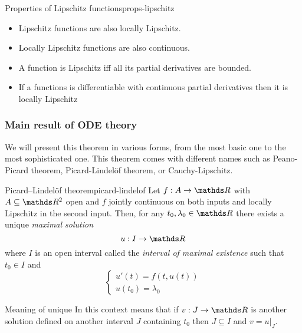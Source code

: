 \documentclass[12pt]{extarticle}
\begin{document}
\begin{proposition}{Properties of Lipschitz functions}{props-lipschitz}
    \begin{itemize}
        \item Lipschitz functions are also locally Lipschitz.
        \item Locally Lipschitz functions are also continuous.
        \item A function is Lipschitz iff all its partial derivatives are bounded.
        \item If a functions is differentiable with continuous partial derivatives then it is locally Lipschitz
    \end{itemize}
\end{proposition}

\subsubsection{Main result of ODE theory}

We will present this theorem in various forms, from the most basic one to the most sophisticated one.
This theorem comes with different names such as Peano-Picard theorem, Picard-Lindelöf theorem, or Cauchy-Lipschitz.

\begin{theorem}{Picard–Lindelöf theorem}{picard-lindelof}
    Let $f: A \to \R$ with $A \subseteq \R^2$ open and $f$ jointly continuous on both inputs and locally Lipschitz in the second input.
    Then, for any $t_0, \lambda_0 \in \R$ there exists a unique \emph{maximal solution}
    \begin{equation}
        u: I \to \R
    \end{equation}
    where $I$ is an open interval called the \emph{interval of maximal existence} such that $t_0 \in I$ and
    \begin{equation}
        \begin{cases}
            u'(t) = f(t, u(t)) \\
            u(t_0) = \lambda_0
        \end{cases}
    \end{equation}
\end{theorem}

\begin{remark}{Meaning of unique}{}
    In this context  means that if $v: J \to \R$ is another solution defined on another interval $J$ containing $t_0$ then $J \subseteq I$ and $v = u|_J$.
\end{remark}
\end{document}
